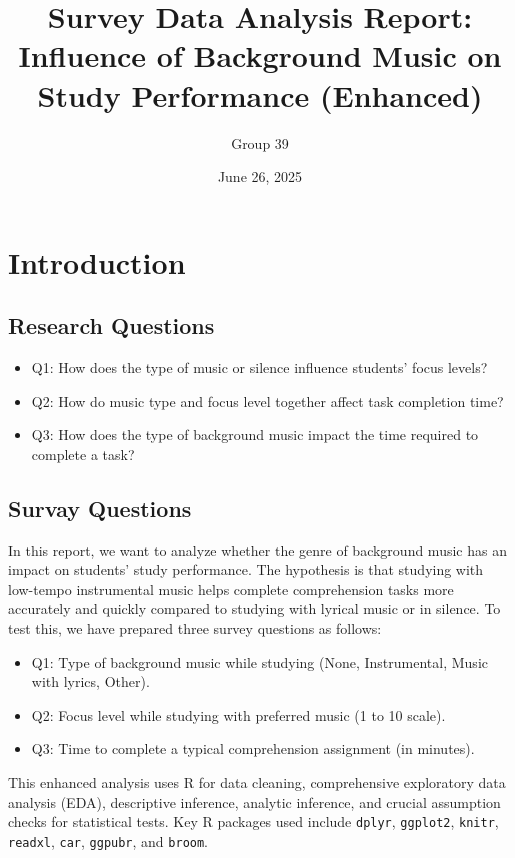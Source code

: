 \documentclass[
]{article}
\title{Survey Data Analysis Report: Influence of Background Music on
Study Performance (Enhanced)}
\author{Group 39}
\date{June 26, 2025}
\providecommand{\tightlist}{%
  \setlength{\itemsep}{0pt}\setlength{\parskip}{0pt}}
\begin{document}
\maketitle

{
\setcounter{tocdepth}{2}
\tableofcontents
}
\section{Introduction}\label{introduction}

\subsection{Research Questions}\label{research-questions}

\begin{itemize}
\tightlist
\item
  Q1: How does the type of music or silence influence students' focus
  levels?
\item
  Q2: How do music type and focus level together affect task completion
  time?
\item
  Q3: How does the type of background music impact the time required to
  complete a task?
\end{itemize}

\subsection{Survay Questions}\label{survay-questions}

In this report, we want to analyze whether the genre of background music
has an impact on students' study performance. The hypothesis is that
studying with low-tempo instrumental music helps complete comprehension
tasks more accurately and quickly compared to studying with lyrical
music or in silence. To test this, we have prepared three survey
questions as follows:

\begin{itemize}
\tightlist
\item
  Q1: Type of background music while studying (None, Instrumental, Music
  with lyrics, Other).
\item
  Q2: Focus level while studying with preferred music (1 to 10 scale).
\item
  Q3: Time to complete a typical comprehension assignment (in minutes).
\end{itemize}

This enhanced analysis uses R for data cleaning, comprehensive
exploratory data analysis (EDA), descriptive inference, analytic
inference, and crucial assumption checks for statistical tests. Key R
packages used include \texttt{dplyr}, \texttt{ggplot2}, \texttt{knitr},
\texttt{readxl}, \texttt{car}, \texttt{ggpubr}, and \texttt{broom}.
\end{document}
